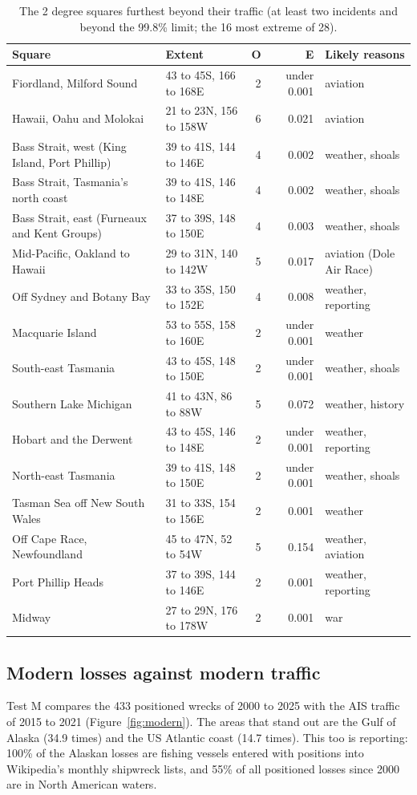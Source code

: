 \documentclass[11pt,a4paper]{article}
\begin{document}
\begin{table}[tbp]\centering\small\caption{The 2 degree squares furthest beyond their traffic (at least two incidents and beyond the 99.8\% limit; the 16 most extreme of 28).}\label{tab:cells}\begin{tabular}{p{4.6cm}p{3.2cm}rrp{3.2cm}}\toprule Square & Extent & O & E & Likely reasons\\\midrule
Fiordland, Milford Sound & 43 to 45S, 166 to 168E & 2 & under 0.001 & aviation\\
Hawaii, Oahu and Molokai & 21 to 23N, 156 to 158W & 6 & 0.021 & aviation\\
Bass Strait, west (King Island, Port Phillip) & 39 to 41S, 144 to 146E & 4 & 0.002 & weather, shoals\\
Bass Strait, Tasmania's north coast & 39 to 41S, 146 to 148E & 4 & 0.002 & weather, shoals\\
Bass Strait, east (Furneaux and Kent Groups) & 37 to 39S, 148 to 150E & 4 & 0.003 & weather, shoals\\
Mid-Pacific, Oakland to Hawaii & 29 to 31N, 140 to 142W & 5 & 0.017 & aviation (Dole Air Race)\\
Off Sydney and Botany Bay & 33 to 35S, 150 to 152E & 4 & 0.008 & weather, reporting\\
Macquarie Island & 53 to 55S, 158 to 160E & 2 & under 0.001 & weather\\
South-east Tasmania & 43 to 45S, 148 to 150E & 2 & under 0.001 & weather, shoals\\
Southern Lake Michigan & 41 to 43N, 86 to 88W & 5 & 0.072 & weather, history\\
Hobart and the Derwent & 43 to 45S, 146 to 148E & 2 & under 0.001 & weather, reporting\\
North-east Tasmania & 39 to 41S, 148 to 150E & 2 & under 0.001 & weather, shoals\\
Tasman Sea off New South Wales & 31 to 33S, 154 to 156E & 2 & 0.001 & weather\\
Off Cape Race, Newfoundland & 45 to 47N, 52 to 54W & 5 & 0.154 & weather, aviation\\
Port Phillip Heads & 37 to 39S, 144 to 146E & 2 & 0.001 & weather, reporting\\
Midway & 27 to 29N, 176 to 178W & 2 & 0.001 & war\\
\bottomrule\end{tabular}\end{table}

\subsection{Modern losses against modern traffic}
Test M compares the 433 positioned wrecks of 2000 to 2025 with the AIS traffic of 2015 to 2021 (Figure~\ref{fig:modern}). The areas that stand out are the Gulf of Alaska (34.9 times) and the US Atlantic coast (14.7 times). This too is reporting: 100\% of the Alaskan losses are fishing vessels entered with positions into Wikipedia's monthly shipwreck lists, and 55\% of all positioned losses since 2000 are in North American waters.
\end{document}
